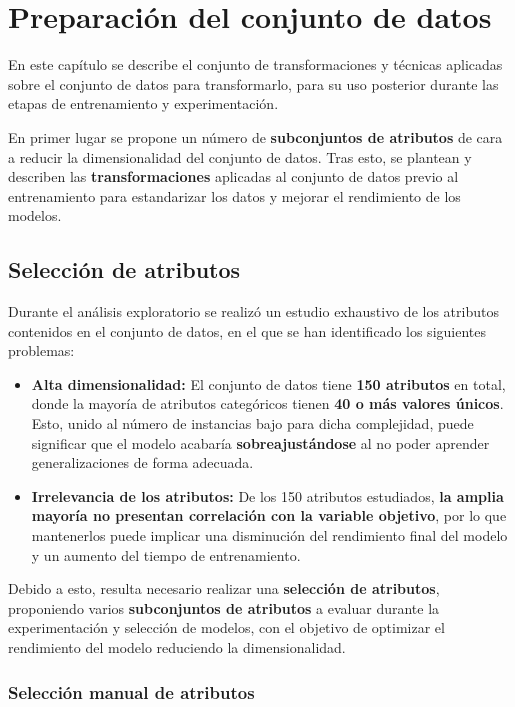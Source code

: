\chapter{Preparación del conjunto de datos}

En este capítulo se describe el conjunto de transformaciones y técnicas aplicadas sobre el conjunto de datos para transformarlo, para su uso posterior durante las etapas de entrenamiento y experimentación.

En primer lugar se propone un número de \textbf{subconjuntos de atributos} de cara a reducir la dimensionalidad del conjunto de datos. Tras esto, se plantean y describen las \textbf{transformaciones} aplicadas al conjunto de datos previo al entrenamiento para estandarizar los datos y mejorar el rendimiento de los modelos.


\section{Selección de atributos}

Durante el análisis exploratorio se realizó un estudio exhaustivo de los atributos contenidos en el conjunto de datos, en el que se han identificado los siguientes problemas:

\begin{itemize}
	\item \textbf{Alta dimensionalidad:} El conjunto de datos tiene \textbf{150 atributos} en total, donde la mayoría de atributos categóricos tienen \textbf{40 o más valores únicos}. Esto, unido al número de instancias bajo para dicha complejidad, puede significar que el modelo acabaría \textbf{sobreajustándose} al no poder aprender generalizaciones de forma adecuada.
	\item \textbf{Irrelevancia de los atributos:} De los 150 atributos estudiados, \textbf{la amplia mayoría no presentan correlación con la variable objetivo}, por lo que mantenerlos puede implicar una disminución del rendimiento final del modelo y un aumento del tiempo de entrenamiento.
\end{itemize}

Debido a esto, resulta necesario realizar una \textbf{selección de atributos}, proponiendo varios \textbf{subconjuntos de atributos} a evaluar durante la experimentación y selección de modelos, con el objetivo de optimizar el rendimiento del modelo reduciendo la dimensionalidad.

\subsection{Selección manual de atributos}

